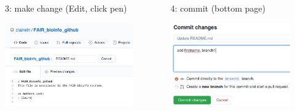 \begin{frame}{ }
\begin{columns}
\begin{column}{0.48\textwidth}
\begin{exampleblock}{3: make change (Edit, click pen)}
    \begin{center}
    \includegraphics[height=3.6cm]{05_history/Images/FAIR_github_EditFile.png}
    \end{center}
\end{exampleblock}
\end{column}
\begin{column}{0.48\textwidth}
\begin{exampleblock}{4: commit (bottom page)}
    \begin{center}
    \includegraphics[height=3.6cm]{05_history/Images/FAIR_github_Commit.png}
    \end{center}
\end{exampleblock}
\end{column}
\end{columns}
\end{frame}
